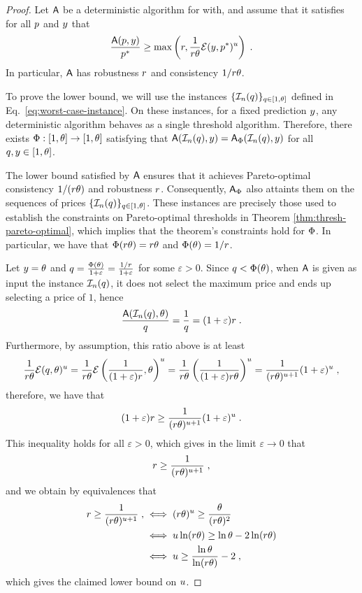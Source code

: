 \begin{proof}
Let $\mbox{\textup{\textsf{A}}}$ be a deterministic algorithm for \OMS{} with, and assume that it satisfies for all $p$ and $y$ that
\[
\frac{\mbox{\textup{\textsf{A}}}(p,y)}{p^*} \geq \max\left( r, \frac{1}{r \theta}\mathcal{E}(y, p^*)^{{u}} \right)\;.
\]
In particular, $\mbox{\textup{\textsf{A}}}$ has robustness $r$ and consistency $1/r\theta$.

To prove the lower bound, we will use the instances $\{\mathcal{I}_n(q)\}_{q \in [1,\theta]}$ defined in Eq.~\eqref{eq:worst-case-instance}. On these instances, for a fixed prediction $y$, any deterministic algorithm behaves as a single threshold algorithm. Therefore, there exists $\Phi : [1,\theta] \to [1,\theta]$ satisfying that $\mbox{\textup{\textsf{A}}}(\mathcal{I}_n(q),y) = \mbox{\textup{\textsf{A}}}_\Phi(\mathcal{I}_n(q),y)$ for all $q, y \in [1,\theta]$. 

The lower bound satisfied by $\mbox{\textup{\textsf{A}}}$ ensures that it achieves Pareto-optimal consistency $1 / (r \theta)$ and robustness $r$. Consequently, $\mbox{\textup{\textsf{A}}}_\Phi$ also attaints them on the sequences of prices $\{\mathcal{I}_n(q)\}_{q \in [1,\theta]}$. These instances are precisely those used to establish the constraints on Pareto-optimal thresholds in Theorem \ref{thm:thresh-pareto-optimal}, which implies that the theorem’s constraints hold for $\Phi$.  In particular, we have that $\Phi(r \theta) = r \theta$ and $\Phi(\theta) = 1/r$. 


Let $y = \theta$ and $q = \frac{\Phi(\theta)}{1+\varepsilon} = \frac{1/r}{1+\varepsilon}$ for some $\varepsilon > 0$. Since $q < \Phi(\theta)$, when $\mbox{\textup{\textsf{A}}}$ is given as input the instance $\mathcal{I}_n(q)$, it does not select the maximum price and ends up selecting a price of $1$, hence
\[
\frac{\mbox{\textup{\textsf{A}}}(\mathcal{I}_n(q),\theta)}{q} 
= \frac{1}{q}
= (1+\varepsilon) r\;.
\]
Furthermore, by assumption, this ratio above is at least 
\[
\frac{1}{r \theta} \mathcal{E}(q, \theta)^{{u}}
= \frac{1}{r \theta} \mathcal{E}\left( \frac{1}{(1+\varepsilon)r}, \theta\right)^{{u}}
= \frac{1}{r \theta} \left( \frac{1}{(1+\varepsilon)r \theta}\right)^{{u}}
= \frac{1}{(r \theta)^{{{u}}+1}}(1+\varepsilon)^{{u}} \;,
\]
therefore, we have that
\begin{align*}
(1+\varepsilon)r \geq \frac{1}{(r \theta)^{{{u}}+1}}(1+\varepsilon)^{{u}}\;.
\end{align*}
This inequality holds for all $\varepsilon>0$, which gives in the limit $\varepsilon \to 0$ that
\[
r  \geq \frac{1}{(r \theta)^{{{u}}+1}}\;,
\]
and we obtain by equivalences that
\begin{align*}
r  \geq \frac{1}{(r \theta)^{{{u}}+1}}\;,
&\iff (r \theta)^{{u}} \geq \frac{\theta}{(r\theta)^2}\\
&\iff {{u}} \ln (r \theta) \geq \ln \theta - 2 \ln(r \theta)\\
&\iff {{u}} \geq \frac{\ln \theta}{\ln(r \theta)} - 2\;,
\end{align*}
which gives the claimed lower bound on ${{u}}$.

\end{proof}